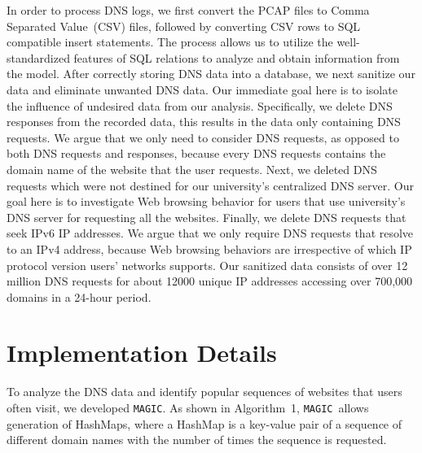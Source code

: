 \documentclass[letterpaper,twocolumn]{article}
\newcommand{\sol}{\texttt{MAGIC}}
\begin{document}
In order to process DNS logs, we first convert the PCAP files to Comma Separated Value~(CSV) files, followed by converting CSV rows to SQL compatible insert statements. 
The process allows us to utilize the well-standardized features of SQL relations to analyze and obtain information from the model.
After correctly storing DNS data into a database, we next sanitize our data and eliminate unwanted DNS data.
Our immediate goal here is to isolate the influence of undesired data from our analysis.
Specifically, we delete DNS responses from the recorded data, this results in the data only containing DNS requests.
We argue that we only need to consider DNS requests, as opposed to both DNS requests and responses, because every DNS requests contains the domain name of the website that the user requests.
Next, we deleted DNS requests which were not destined for our university's centralized DNS server.
Our goal here is to investigate Web browsing behavior for users that use university's DNS server for requesting all the websites.
Finally, we delete DNS requests that seek IPv6 IP addresses.
We argue that we only require DNS requests that resolve to an IPv4 address, because Web browsing behaviors are irrespective of which IP protocol version users' networks supports.
Our sanitized data consists of over 12 million DNS requests for about 12000 unique IP addresses accessing over 700,000 domains in a 24-hour period.



\vspace{-10pt}
\section{Implementation Details}
\label{sec:technique}
\vspace{-8pt}

To analyze the DNS data and identify popular sequences of websites that users often visit, we developed \sol.
As shown in Algorithm~1, \sol\ allows generation of HashMaps, where a HashMap is a key-value pair of a sequence of different domain names with the number of times the sequence is requested.
\end{document}
